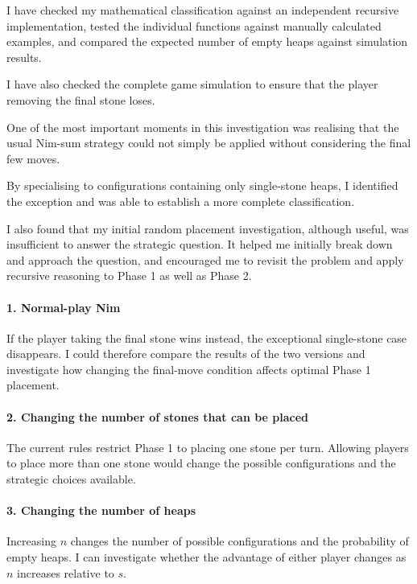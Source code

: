 \documentclass[11pt]{article}
\newcommand{\keywordfont}{\textsc}
\newcommand{\keyword}[1]{%
  \marginpar{\raggedright\small\keywordfont{#1}}}
\begin{document}
I have \keyword{Check} checked my mathematical classification against an independent recursive implementation, tested the individual functions against manually calculated examples, and compared the expected number of empty heaps against simulation results.

I have also checked the complete game simulation to ensure that the player removing the final stone loses.


One of the most \keyword{Reflect} important moments in this investigation was realising that the usual Nim-sum strategy could not simply be applied without considering the final few moves.

By specialising to\keyword{Simplification}  configurations containing only single-stone heaps, I identified the exception and was able to establish a more complete classification.

I also found that my initial random placement investigation, although useful, was insufficient to answer the strategic question. It helped me initially break down and approach the question, and encouraged me to revisit the problem and apply recursive reasoning to Phase 1 as well as Phase 2.

\paragraph{1. Normal-play Nim}

If the player \keyword{Extend} taking the final stone wins instead, the exceptional single-stone case disappears. I could therefore compare the results of the two versions and investigate how changing the final-move condition affects optimal Phase 1 placement.

\paragraph{2. Changing the number of stones that can be placed}

The current rules restrict Phase 1 to placing one stone per turn. Allowing players to place more than one stone would change the possible configurations and the strategic choices available.

\paragraph{3. Changing the number of heaps}

Increasing $n$ changes the number of possible configurations and the probability of empty heaps. I can investigate whether the advantage of either player changes as $n$ increases relative to $s$.
\end{document}
